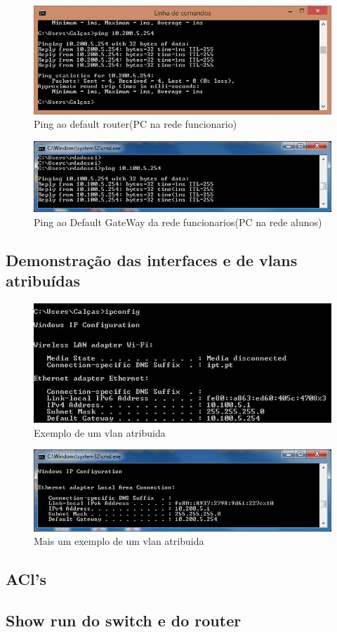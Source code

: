 \documentclass[a4paper,titlepage]{article}
\begin{document}
			\begin{figure}[H]
					\centering
					\includegraphics[width=\linewidth]{ping_funcionario.jpg}
					\caption{Ping ao default router(PC na rede funcionario)}
			\end{figure}
			
			\begin{figure}[H]
					\centering
					\includegraphics[width=\linewidth]{pingAoDefaultGateWay.jpg}
					\caption{Ping ao Default GateWay da rede funcionarios(PC na rede alunos)}
			\end{figure}
		\subsection{Demonstração das interfaces e de vlans atribuídas}
			
		
			\begin{figure}[H]
					\centering
					\includegraphics[width=\linewidth]{vlan_funcionarios_ip.jpg}
					\caption{Exemplo de um vlan atribuida}
			\end{figure}
			\begin{figure}[H]
					\centering
					\includegraphics[width=\linewidth]{vlanAlunosIp.jpg}
					\caption{Mais um exemplo de um vlan atribuida}
			\end{figure}
		\subsection{ACl's}
			
		\subsection{Show run do switch e do router}
			
			
\end{document}

